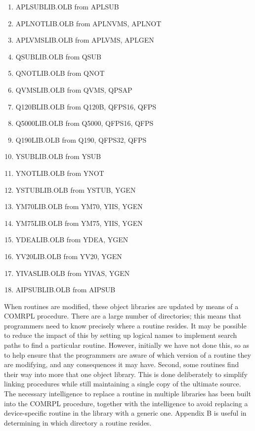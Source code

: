 \begin{enumerate} %
\item APLSUBLIB.OLB   from APLSUB
\item APLNOTLIB.OLB   from APLNVMS, APLNOT
\item APLVMSLIB.OLB   from APLVMS, APLGEN
\smallskip
\item QSUBLIB.OLB     from QSUB
\item QNOTLIB.OLB     from QNOT
\item QVMSLIB.OLB     from QVMS, QPSAP
\item Q120BLIB.OLB    from Q120B, QFPS16, QFPS
\item Q5000LIB.OLB    from Q5000, QFPS16, QFPS
\item Q190LIB.OLB     from Q190, QFPS32, QFPS
\smallskip
\item YSUBLIB.OLB     from YSUB
\item YNOTLIB.OLB     from YNOT
\item YSTUBLIB.OLB    from YSTUB, YGEN
\item YM70LIB.OLB     from YM70, YIIS, YGEN
\item YM75LIB.OLB     from YM75, YIIS, YGEN
\item YDEALIB.OLB     from YDEA, YGEN
\item YV20LIB.OLB     from YV20, YGEN
\item YIVASLIB.OLB    from YIVAS, YGEN
\smallskip
\item AIPSUBLIB.OLB   from AIPSUB

\end{enumerate} %
When routines are modified, these object libraries are updated by
means of a COMRPL procedure.  There are a large number of directories;
this means that programmers need to know precisely where a
routine resides.  It may be possible to reduce the impact of this by
setting up logical names to implement search paths to find a
particular routine.  However, initially we have not done this, so as
to help ensure that the programmers are aware of which version of a
routine they are modifying, and any consequences it may have.  Second,
some routines find their way into more that one object library.  This
is done deliberately to simplify linking procedures while still
maintaining a single copy of the ultimate source.  The necessary
intelligence to replace a routine in multiple libraries has been built
into the COMRPL procedure, together with the intelligence to avoid
replacing a device-specific routine in the library with a generic one.
Appendix B is useful in determining in which directory a routine
resides.

